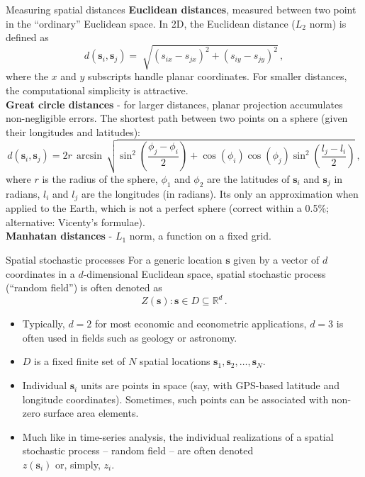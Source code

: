 \documentclass{beamer}
\begin{document}
\begin{frame}{Measuring spatial distances}
\small{\textbf{Euclidean distances}, measured between two point in the ``ordinary'' Euclidean space. In 2D, the Euclidean distance ($L_2$ norm) is defined as 
$$
d(\bm{s}_i, \bm{s}_j) = \sqrt[]{(s_{ix}-s_{jx})^2+(s_{iy}-s_{jy})^2}\,,
$$
where the $x$ and $y$ subscripts handle planar coordinates. For smaller distances, the computational simplicity is attractive.\\
\medskip
\textbf{Great circle distances} - for larger distances, planar projection accumulates non-negligible errors. The shortest path between two points on a sphere (given their longitudes and latitudes): 
$$
d(\bm{s}_i, \bm{s}_j) = 2r \, \arcsin \,
 \sqrt{ \sin^2 \left( \frac{\phi_j-\phi_i}{2} \right)
       + \cos(\phi_i) \cos(\phi_j)
       \sin^2 \left( \frac{l_j-l_i}{2} \right) }\,,
$$
where $r$ is the radius of the sphere, $\phi_1$ and $\phi_2$ are the latitudes of $\bm{s}_i$ and $\bm{s}_j$ in radians, $l_i$ and $l_j$ are the longitudes (in radians). Its only an approximation when applied to the Earth, which is not a perfect sphere (correct within a 0.5\%; alternative: Vicenty's formulae).\\
\medskip
\textbf{Manhatan distances} - $L_1$ norm, a function on a fixed grid.
}
\end{frame}
\begin{frame}{Spatial stochastic processes}
For a generic location $\bm{s}$ given by a vector of $d$ coordinates in a $d$-dimensional Euclidean space, spatial stochastic process \\(``random field'') is often denoted as
$$ Z(\bm{s}): \bm{s} \in D \subseteq \mathbb{R}^d \, .$$
\vspace{-0.5cm}
\begin{itemize}
    \item Typically, $d=2$ for most economic and econometric applications, $d=3$ is often used in fields such as geology or astronomy. 
    \smallskip
    \item $D$ is a fixed finite set of $N$ spatial locations $\bm{s}_1, \bm{s}_2, \dots, \bm{s}_N$. 
    \smallskip
    \item Individual $\bm{s}_i$ units are points in space (say, with GPS-based latitude and longitude coordinates). Sometimes, such points can be associated with non-zero surface area elements.
    \item Much like in time-series analysis, the individual realizations of a spatial stochastic process -- random field -- are often denoted \\$z(\bm{s}_i)$ or, simply, $z_i$.
\end{itemize}
\end{frame}
\end{document}
